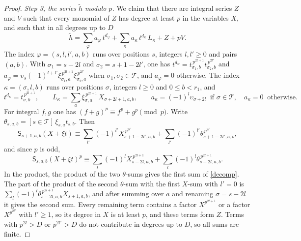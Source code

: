 \begin{proof}
\emph{Step 3, the series $\widetilde h$ modulo $p$.} We claim that there are integral series $Z$ and $V$ such that every monomial of $Z$ has degree at least $p$ in the variables $X$, and such that in all degrees up to $D$
\begin{equation}\label{decomp}
\widetilde h=\sum_\varphi a_\varphi\,t^{d_\varphi}+\sum_\kappa a_\kappa\,t^{d_\kappa}\,L_\kappa+Z+pV .
\end{equation}
The index $\varphi=(s,l,l',a,b)$ runs over positions $s$, integers $l,l'\ge0$ and pairs $(a,b)$. With $\sigma_1=s-2l$ and $\sigma_2=s+1-2l'$, one has $t^{d_\varphi}=t_{\sigma_1,b}^{\,p^{2l+1}}t_{\sigma_2,b}^{\,p^{2l'}}$ and $a_\varphi=\upsilon_s(-1)^{l+l'}\xi_{\sigma_1,a}^{\,p^{2l+1}}\xi_{\sigma_2,a}^{\,p^{2l'}}$ when $\sigma_1,\sigma_2\in\mathcal T$, and $a_\varphi=0$ otherwise. The index $\kappa=(\sigma,l,b)$ runs over positions $\sigma$, integers $l\ge0$ and $0\le b<r_1$, and
\begin{equation}\label{kappaterm}
t^{d_\kappa}=t_{\sigma,b}^{\,p^{2l+1}},\qquad L_\kappa=\sum_a\xi_{\sigma,a}^{\,p^{2l+1}}\,X_{\sigma+2l+1,a,b},\qquad a_\kappa=(-1)^l\upsilon_{\sigma+2l}\ \text{ if }\sigma\in\mathcal T,\quad a_\kappa=0\ \text{ otherwise}.
\end{equation}
For integral $f,g$ one has $(f+g)^p\equiv f^p+g^p\pmod p$. Write $\theta_{s,a,b}=[s\in\mathcal T]\,\xi_{s,a}t_{s,b}$. Then
\[
\mathsf S_{s+1,a,b}(X+\xi t)\equiv\sum_{l'}(-1)^{l'}X_{s+1-2l',a,b}^{\,p^{2l'}}+\sum_{l'}(-1)^{l'}\theta_{s+1-2l',a,b}^{\,p^{2l'}},
\]
and since $p$ is odd,
\[
\mathsf S_{s,a,b}(X+\xi t)^p\equiv\sum_l(-1)^lX_{s-2l,a,b}^{\,p^{2l+1}}+\sum_l(-1)^l\theta_{s-2l,a,b}^{\,p^{2l+1}}.
\]
In the product, the product of the two $\theta$-sums gives the first sum of \eqref{decomp}. The part of the product of the second $\theta$-sum with the first $X$-sum with $l'=0$ is $\sum_l(-1)^l\theta_{s-2l,a,b}^{\,p^{2l+1}}X_{s+1,a,b}$, and after summing over $a$ and renaming $\sigma=s-2l$ it gives the second sum. Every remaining term contains a factor $X^{p^{2l+1}}$ or a factor $X^{p^{2l'}}$ with $l'\ge1$, so its degree in $X$ is at least $p$, and these terms form $Z$. Terms with $p^{2l}>D$ or $p^{2l'}>D$ do not contribute in degrees up to $D$, so all sums are finite.


\end{proof}
